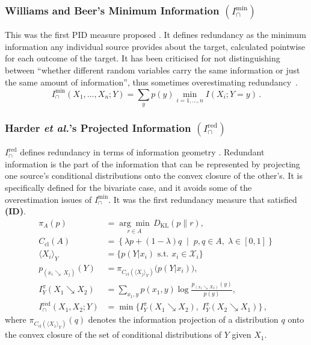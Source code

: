 \documentclass{article}
\makeatletter
\newcommand{\etalx}{\textit{et al.\@}\xspace}
\newcommand{\Xs}{X_1,\ldots,X_n}
\newcommand{\ID}{\textbf{(ID)}\xspace} %
\newcommand{\Imin}{\ensuremath{I_\cap^{\text{min}}}\xspace}
\newcommand{\Ired}{\ensuremath{I^{\text{red}}_\cap}\xspace}
\makeatother
\begin{document}
\subsubsection*{Williams and Beer's Minimum Information $(\Imin)$}
This was the first PID measure proposed \cite{williams2010nonnegative}. It defines redundancy as the minimum information any individual source provides about the target, calculated pointwise for each outcome of the target. It has been criticised for not distinguishing between ``whether different random variables carry the same information or just the same amount of information'', thus sometimes overestimating redundancy~\cite{bertschinger2013shared, harder2013bivariate, griffith2015quantifying}.
    \begin{equation}
        \Imin(\Xs;Y) = \sum_y p(y) \min_{i=1,\ldots,n} I(X_i;Y=y) \,.
    \end{equation}

\subsubsection*{Harder \etalx's Projected Information $(\Ired)$}
$\Ired$ defines redundancy in terms of information geometry \cite{harder2013bivariate}. Redundant information is the part of the information that can be represented by projecting one source’s conditional distributions onto the convex closure of the other’s. It is specifically defined for the bivariate case, and it avoids some of the overestimation issues of $\Imin$. It was the first redundancy measure that satisfied \ID. 
    \begin{align}
    \pi_A(p) &= \underset{r \in A}{\arg\min}\,D_{\mathrm{KL}}(p \| r), \\[3pt]
    C_{\mathrm{cl}}(A) & = \left\{ \lambda p + (1-\lambda) q \;\middle|\; p, q \in A,\; \lambda \in [0,1] \right\} \\[3pt]
    \langle X_i \rangle_Y & = \{p(Y|x_i) \text{ s.t. } x_i\in\mathcal{X}_i\} \\[3pt]
    p_{(x_i\searrow \,X_j)}(Y) &= \pi_{C_{\mathrm{cl}}(\langle X_j \rangle_Y)} \big( p(Y|x_i) \big), \\[3pt]
    I_Y^\pi(X_1 \!\!\searrow\! X_2) &= \sum_{x_1,y} p(x_1,y) \log \frac{p_{(x_1 \searrow\,X_2)}(y)}{p(y)}, \\[3pt]
    \Ired(X_1, X_2; Y) &= \min \big\{ I_Y^\pi(X_1 \!\!\searrow\! X_2),\; I_Y^\pi(X_2 \!\!\searrow\! X_1) \big\} \,,
    \end{align}
    where $\pi_{C_{\mathrm{cl}}(\langle X_1 \rangle_Y)}(q)$ denotes the information projection of a distribution $q$ onto the convex closure of the set of conditional distributions of $Y$ given $X_1$.
\end{document}
